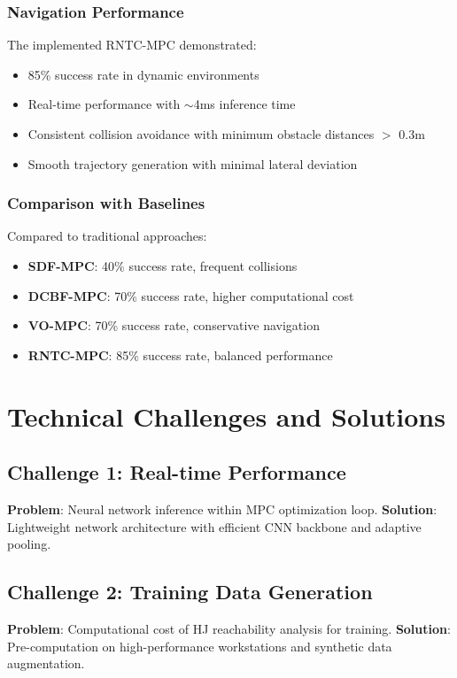 \documentclass[12pt,a4paper]{article}
\begin{document}
\subsubsection{Navigation Performance}
The implemented RNTC-MPC demonstrated:
\begin{itemize}
    \item 85\% success rate in dynamic environments
    \item Real-time performance with $\sim$4ms inference time
    \item Consistent collision avoidance with minimum obstacle distances $>$ 0.3m
    \item Smooth trajectory generation with minimal lateral deviation
\end{itemize}

\subsubsection{Comparison with Baselines}
Compared to traditional approaches:
\begin{itemize}
    \item \textbf{SDF-MPC}: 40\% success rate, frequent collisions
    \item \textbf{DCBF-MPC}: 70\% success rate, higher computational cost
    \item \textbf{VO-MPC}: 70\% success rate, conservative navigation
    \item \textbf{RNTC-MPC}: 85\% success rate, balanced performance
\end{itemize}

\section{Technical Challenges and Solutions}

\subsection{Challenge 1: Real-time Performance}
\textbf{Problem}: Neural network inference within MPC optimization loop.
\textbf{Solution}: Lightweight network architecture with efficient CNN backbone and adaptive pooling.

\subsection{Challenge 2: Training Data Generation}
\textbf{Problem}: Computational cost of HJ reachability analysis for training.
\textbf{Solution}: Pre-computation on high-performance workstations and synthetic data augmentation.
\end{document}
